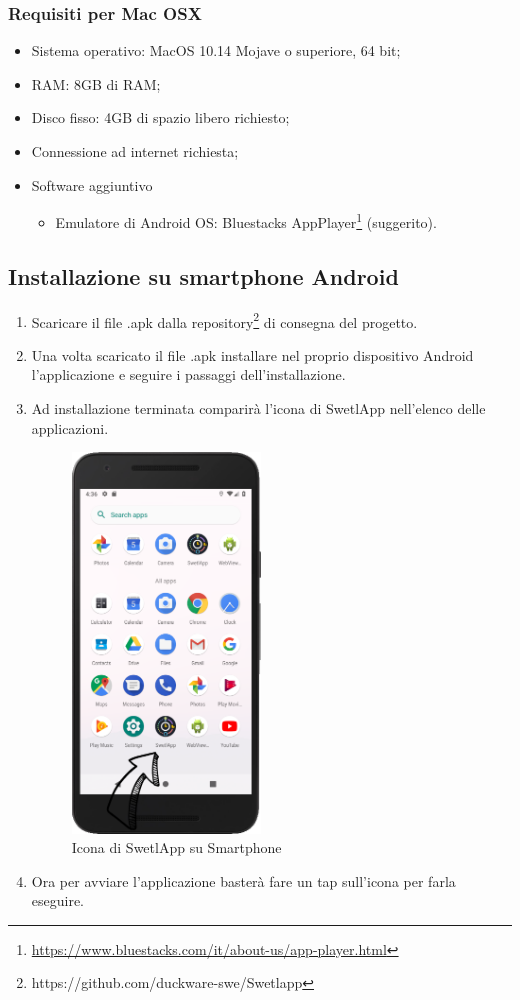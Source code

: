 \subsubsection{Requisiti per Mac OSX}
\label{sec:requisiti_mac}
\begin{itemize}
	\item Sistema operativo: MacOS 10.14 Mojave o superiore, 64 bit;
	\item RAM: 8GB di RAM;
	\item Disco fisso: 4GB di spazio libero richiesto;
	\item Connessione ad internet richiesta;
	\item Software aggiuntivo
	\begin{itemize}
		\item Emulatore di Android OS: Bluestacks AppPlayer\footnote{\href{https://www.bluestacks.com/it/about-us/app-player.html}{https://www.bluestacks.com/it/about-us/app-player.html}} (suggerito).
	\end{itemize}
\end{itemize}
\subsection{Installazione su smartphone Android}
\begin{enumerate}
	\item Scaricare il file .apk dalla repository\footnote{https://github.com/duckware-swe/Swetlapp} di consegna del progetto.
	\item Una volta scaricato il file .apk installare nel proprio dispositivo Android l'applicazione e seguire i passaggi dell'installazione.
	\item Ad installazione terminata comparirà l'icona di SwetlApp nell'elenco delle applicazioni.
	\begin{figure}[htbp]
		\centering
		\includegraphics[width=5cm]{../includes/pics/screen1.PNG}
		\caption{\label{fig:screen1}Icona di SwetlApp su Smartphone}
	\end{figure}
	\item Ora per avviare l'applicazione basterà fare un tap sull'icona per farla eseguire.
\end{enumerate}



